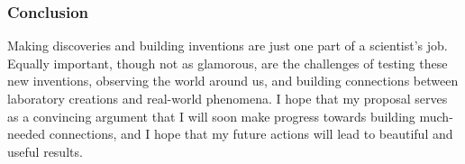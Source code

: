 \documentclass[12pt]{article}
\begin{document}
\vspace{-0.2cm}
\subsubsection*{Conclusion}
Making discoveries and building inventions are just one part of a scientist's job.
Equally important, though not as glamorous, are the challenges of testing these new inventions, observing the world around us, and building connections between laboratory creations and real-world phenomena.
I hope that my proposal serves as a convincing argument that I will soon make progress towards building much-needed connections, and I hope that my future actions will lead to beautiful and useful results.


\renewcommand{\section}[2]{}
\begin{multicols}{2}
\footnotesize


\end{multicols}
\end{document}
